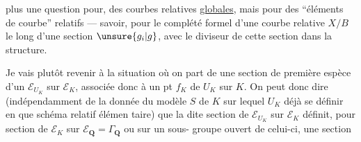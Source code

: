 plus une question pour, des courbes relatives
\uline{globales}, mais pour des ``éléments de
courbe'' relatifs --- savoir, pour le
complété formel d'une courbe relative
$X/B$ le long d'une section $\unsure{g_i|g}$,
avec le diviseur de cette section  %
dans la structure.

Je vais plutôt revenir à la situation
où on part de une section de première
espèce d'un $\mathcal E_{U_K}$ sur $\mathcal E_K$, associée
donc à un pt  $f_K$ de $U_K$ sur $K$.
On peut donc dire (indépendamment de
la donnée du modèle $S$ de $K$ sur
lequel $U_K$  déjà se définir
en  que schéma relatif élémen%
taire) que la dite section de
$\mathcal E_{U_K}$ sur $\mathcal E_K$  définit, pour  section
de $\mathcal E_K$ sur $\mathcal E_{\mathbf Q}=\Gamma_{\mathbf Q}$ ou sur un sous-%
groupe ouvert  de celui-ci, une section
